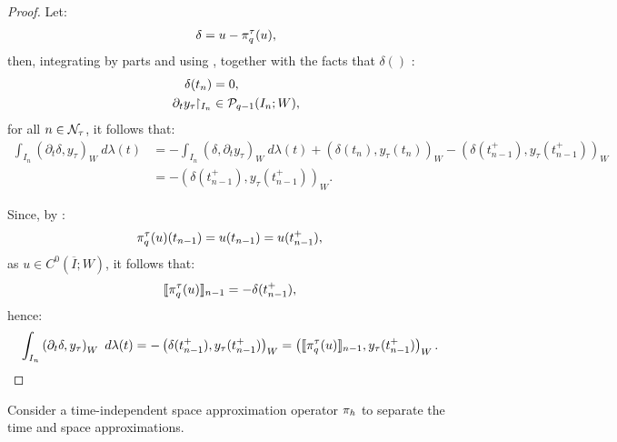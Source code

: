 \begin{proof}
    Let:
    \begin{align*}
        \delta = u - \pi^{\tau}_q(u),
    \end{align*}
    then, integrating by parts and using , together with the facts that $\delta()$ :
    \begin{align*}
        \delta(t_n) &= 0, \\
        \partial_t y_{\tau}\!\!\restriction_{I_n} &\in \mathcal{P}_{q - 1}(I_n; W),
    \end{align*}
    for all $n \in \mathcal{N}_{\tau}$, it follows that:
    \begin{align*}
        \int_{I_n} \left( \partial_t \delta, y_{\tau} \right)_W ~ d \lambda(t) &= - \int_{I_n} \left( \delta, \partial_t y_{\tau} \right)_W ~ d \lambda(t) + \left( \delta(t_n), y_{\tau}(t_n) \right)_W - \left( \delta(t_{n - 1}^+), y_{\tau}(t_{n - 1}^+) \right)_W \\
        &= - \left( \delta(t_{n - 1}^+), y_{\tau}(t_{n - 1}^+) \right)_W.
    \end{align*}

    Since, by :
    \begin{align*}
        \pi^{\tau}_q(u)(t_{n - 1}) = u(t_{n - 1}) &= u(t_{n - 1}^+),
    \end{align*}
    as $u \in C^0(\overline{I}; W)$, it follows that:
    \begin{align*}
        \llbracket \pi^{\tau}_q(u) \rrbracket_{n - 1} &= - \delta(t_{n - 1}^+),
    \end{align*}
    hence:
    \begin{align*}
        \int_{I_n} \left( \partial_t \delta, y_{\tau} \right)_W ~ d \lambda(t) &= - \left( \delta(t_{n - 1}^+), y_{\tau}(t_{n - 1}^+) \right)_W = \left( \llbracket \pi^{\tau}_q(u) \rrbracket_{n - 1}, y_{\tau}(t_{n - 1}^+) \right)_W.
    \end{align*}
\end{proof}

Consider a time-independent space approximation operator $\pi_h$ to separate the time and space approximations.


